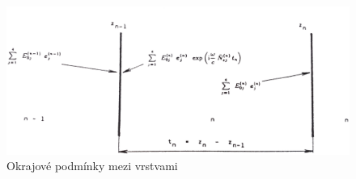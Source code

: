\begin{figure}
    \begin{center}
        \includegraphics[width=5in]{img/border.eps}
    \end{center}
    \caption{Okrajové podmínky mezi vrstvami}
\end{figure}

